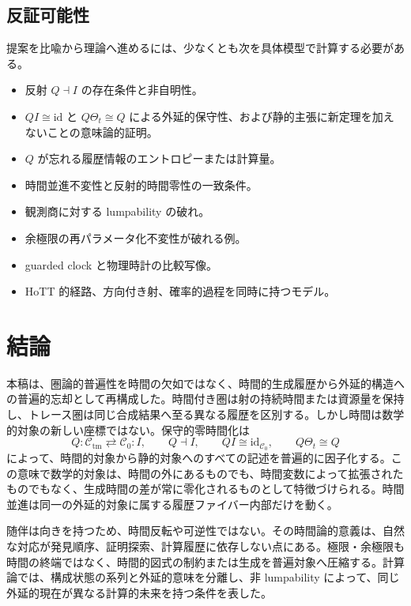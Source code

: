 \documentclass[a4paper,11pt]{ltjsarticle}
\theoremstyle{remark}
\newcommand{\C}{\mathcal C}
\newcommand{\id}{\mathrm{id}}
\begin{document}
\subsection{反証可能性}
提案を比喩から理論へ進めるには、少なくとも次を具体模型で計算する必要がある。
\begin{itemize}
  \item 反射 $Q\dashv I$ の存在条件と非自明性。
  \item $QI\cong\id$ と $Q\Theta_t\cong Q$ による外延的保守性、および静的主張に新定理を加えないことの意味論的証明。
  \item $Q$ が忘れる履歴情報のエントロピーまたは計算量。
  \item 時間並進不変性と反射的時間零性の一致条件。
  \item 観測商に対する lumpability の破れ。
  \item 余極限の再パラメータ化不変性が破れる例。
  \item guarded clock と物理時計の比較写像。
  \item HoTT 的経路、方向付き射、確率的過程を同時に持つモデル。
\end{itemize}

\section{結論}

本稿は、圏論的普遍性を時間の欠如ではなく、時間的生成履歴から外延的構造への普遍的忘却として再構成した。時間付き圏は射の持続時間または資源量を保持し、トレース圏は同じ合成結果へ至る異なる履歴を区別する。しかし時間は数学的対象の新しい座標ではない。保守的零時間化は
\begin{equation*}
 Q:\C_{\mathrm{tm}}\rightleftarrows\C_0:I,
 \qquad
 Q\dashv I,
 \qquad
 QI\cong\id_{\C_0},
 \qquad
 Q\Theta_t\cong Q
\end{equation*}
によって、時間的対象から静的対象へのすべての記述を普遍的に因子化する。この意味で数学的対象は、時間の外にあるものでも、時間変数によって拡張されたものでもなく、生成時間の差が常に零化されるものとして特徴づけられる。時間並進は同一の外延的対象に属する履歴ファイバー内部だけを動く。

随伴は向きを持つため、時間反転や可逆性ではない。その時間論的意義は、自然な対応が発見順序、証明探索、計算履歴に依存しない点にある。極限・余極限も時間の終端ではなく、時間的図式の制約または生成を普遍対象へ圧縮する。計算論では、構成状態の系列と外延的意味を分離し、非 lumpability によって、同じ外延的現在が異なる計算的未来を持つ条件を表した。
\end{document}
